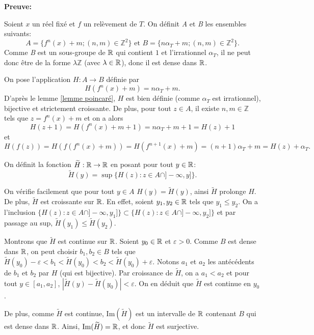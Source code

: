 	\textbf{Preuve:}
	\par Soient $x$ un réel fixé et $f$ un relèvement de $T$. On définit \textit{A} et\textit{ B} les ensembles suivants:
	$$A =\lbrace f^n(x)+m; (n,m) \in \mathbb{Z}^2 \rbrace \text{ et } B=\lbrace n\alpha_T +m; (n,m)\in \mathbb{Z}^2\rbrace.$$
	Comme \textit{B} est un sous-groupe de ${\mathbb{R}}$ qui contient $1$ et l'irrationnel $\alpha_T$, il ne peut donc être de la forme $\lambda \mathbb{Z}$ (avec $\lambda \in {\mathbb{R}}$), donc il est dense dans ${\mathbb{R}}$.\\
	\par On pose l'application $H: A\to B$ définie par $$H(f^n(x)+m)= n \alpha_T +m.$$ D'après le lemme \ref{lemme poincaré}, $H$ est bien définie (comme $\alpha_T$ est irrationnel), bijective et strictement croissante. De plus, pour tout $z \in A$, il existe $n,m\in \mathbb{Z}$ tels que $z=f^n(x)+m$ et on a alors $$H(z+1)=H(f^n(x)+m+1)=n\alpha_T+m+1=H(z)+1$$
	et $$H(f(z))=H(f(f^n(x)+m))=H(f^{n+1}(x)+m)=(n+1)\alpha_T +m =H(z)+\alpha_T.$$

	\par On définit la fonction $\widetilde{H}:{\mathbb{R}} \to {\mathbb{R}}$ en posant pour tout $y \in {\mathbb{R}}$:
	$$\widetilde{H}(y)= \sup \lbrace H(z): z \in A \cap ]-\infty,y]\rbrace.$$


	\par  On vérifie facilement que pour tout $y \in A$ $H(y)=\widetilde{H}(y)$, ainsi $\widetilde{H}$ prolonge $H$. De plus, $\widetilde{H}$ est croissante sur ${\mathbb{R}}$. En effet, soient $y_1, y_2 \in {\mathbb{R}}$ tels que $y_1\leq y_2$. On a l'inclusion $\lbrace H(z): z \in A \cap ]-\infty,y_1]\rbrace \subset \lbrace H(z): z \in A \cap ]-\infty,y_2]\rbrace$ et par passage au sup, $\widetilde{H}(y_1)\leq \widetilde{H}(y_2)$.\\

	\par Montrons que $\widetilde{H}$ est continue sur ${\mathbb{R}}$. Soient $y_0 \in {\mathbb{R}}$ et $\varepsilon >0$. Comme $B$ est dense dans ${\mathbb{R}}$, on peut choisir $b_1, b_2 \in B$ tels que $\widetilde{H}(y_0)-\varepsilon < b_1 < \widetilde{H}(y_0) <b_2<\widetilde{H}(y_0)+\varepsilon$. Notons $a_1$ et $a_2$ les antécédents de $b_1$ et $b_2$ par $H$ (qui est bijective). Par croissance de $\widetilde{H}$, on a $a_1<a_2$ et pour tout $y\in [a_1,a_2]$, $|\widetilde{H}(y)-\widetilde{H}(y_0)|<\varepsilon$. On en déduit que $\widetilde{H}$ est continue en $y_0$.\\


	\par De plus, comme $\widetilde{H}$ est continue, $\mathrm{Im}(\widetilde{H})$ est un intervalle de ${\mathbb{R}}$ contenant $B$ qui est dense dans ${\mathbb{R}}$. Ainsi, $\mathrm{Im}(\widetilde{H})={\mathbb{R}}$, et donc $\widetilde{H}$ est surjective.\\


